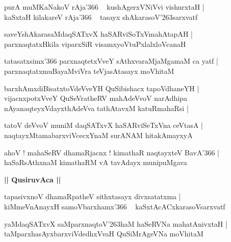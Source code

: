\documentclass[twoside,12pt,openright]{book}
\def\S{\char'263}
\newcounter{shloka}[chapter]
\def\uvaca#1{\centerline{{\large\textbf{#1}}}}
\begin{document}
\begin{shloka}
purA muMKaNakoV rAja\char'366 ~ kushAgerxVNiVvi vishurxtaH |\\
kaSxtaH kilakareV rAja\char'366 ~ tasayx shAkarasoV\S sarxvatf 
\end{shloka}

\begin{shloka}
saveYshAkarasaMdaqSATxvX haSARviSoTxVmahAtapAH |\\
parxnaqtatxHkila viparxSiR visamxyoVtuPxlalxloVcanaH 
\end{shloka}

\begin{shloka}
tatasatxsimx\char'366 parxnaqtetxVveY sAthxvaraMjaMgamaM ca yatf |\\
parxnaqtatxmuBayaMviVra teVjasAtasayx moVhitaM 
\end{shloka}

\begin{shloka}
barxhAmxdiBisatxtoVdeVveYH QuSibishacx tapoVdhaneYH |\\
vijacnxpotxVveY QuSeVratheRV mahAdeVvoV narAdhipa \\
nAyanaqteyxVdayxthAdeVva tathAtavxM katuRmahaRsi |\\
\end{shloka}

\begin{shloka}
tatoV deVvoV muniM daqSATxvX haSARviSeTxVna ceVtasA |\\
naqtayxMtamabarxviVcecxYnaM surANAM hitakAmayxyA 
\end{shloka}

\begin{shloka}
ahoV ! mahaSeRV dhamaRjacnx ! kimathaR naqtayxteV BavA\char'366  |\\
haSaRsAthxnaM kimathaRM vA tavAdayx munipuMgava
\end{shloka}

\uvaca{|| QusiruvAca ||}

\begin{shloka}
tapasivxnoV dhamaRpatheV sithxtasayx divxsatatxma |\\
kiMmeVnAnayxH samoVbarxhamx\char'366 ~ kaSxtAcACxkarasoVsarxvatf 
\end{shloka}

\begin{shloka}
yaMdaqSATxvX saMparxnaqtoV\S haM haSeRVNa mahatAnivxtaH |\\
taMparxhasAyxbarxviVdedhxVvaH QuSiMrAgeVNa moVhitaM
\end{shloka}
\end{document}
